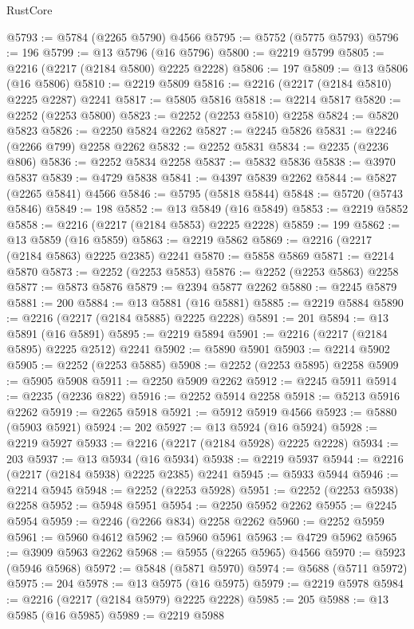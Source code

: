 \begin{lexlean}{RustCore}
\begin{coremodule}
@5793 := @5784 (@2265 @5790) @4566
@5795 := @5752 (@5775 @5793)
@5796 := 196
@5799 := @13 @5796 (@16 @5796)
@5800 := @2219 @5799
@5805 := @2216 (@2217 (@2184 @5800) @2225 @2228)
@5806 := 197
@5809 := @13 @5806 (@16 @5806)
@5810 := @2219 @5809
@5816 := @2216 (@2217 (@2184 @5810) @2225 @2287) @2241
@5817 := @5805 @5816
@5818 := @2214 @5817
@5820 := @2252 (@2253 @5800)
@5823 := @2252 (@2253 @5810) @2258
@5824 := @5820 @5823
@5826 := @2250 @5824 @2262
@5827 := @2245 @5826
@5831 := @2246 (@2266 @799) @2258 @2262
@5832 := @2252 @5831
@5834 := @2235 (@2236 @806)
@5836 := @2252 @5834 @2258
@5837 := @5832 @5836
@5838 := @3970 @5837
@5839 := @4729 @5838
@5841 := @4397 @5839 @2262
@5844 := @5827 (@2265 @5841) @4566
@5846 := @5795 (@5818 @5844)
@5848 := @5720 (@5743 @5846)
@5849 := 198
@5852 := @13 @5849 (@16 @5849)
@5853 := @2219 @5852
@5858 := @2216 (@2217 (@2184 @5853) @2225 @2228)
@5859 := 199
@5862 := @13 @5859 (@16 @5859)
@5863 := @2219 @5862
@5869 := @2216 (@2217 (@2184 @5863) @2225 @2385) @2241
@5870 := @5858 @5869
@5871 := @2214 @5870
@5873 := @2252 (@2253 @5853)
@5876 := @2252 (@2253 @5863) @2258
@5877 := @5873 @5876
@5879 := @2394 @5877 @2262
@5880 := @2245 @5879
@5881 := 200
@5884 := @13 @5881 (@16 @5881)
@5885 := @2219 @5884
@5890 := @2216 (@2217 (@2184 @5885) @2225 @2228)
@5891 := 201
@5894 := @13 @5891 (@16 @5891)
@5895 := @2219 @5894
@5901 := @2216 (@2217 (@2184 @5895) @2225 @2512) @2241
@5902 := @5890 @5901
@5903 := @2214 @5902
@5905 := @2252 (@2253 @5885)
@5908 := @2252 (@2253 @5895) @2258
@5909 := @5905 @5908
@5911 := @2250 @5909 @2262
@5912 := @2245 @5911
@5914 := @2235 (@2236 @822)
@5916 := @2252 @5914 @2258
@5918 := @5213 @5916 @2262
@5919 := @2265 @5918
@5921 := @5912 @5919 @4566
@5923 := @5880 (@5903 @5921)
@5924 := 202
@5927 := @13 @5924 (@16 @5924)
@5928 := @2219 @5927
@5933 := @2216 (@2217 (@2184 @5928) @2225 @2228)
@5934 := 203
@5937 := @13 @5934 (@16 @5934)
@5938 := @2219 @5937
@5944 := @2216 (@2217 (@2184 @5938) @2225 @2385) @2241
@5945 := @5933 @5944
@5946 := @2214 @5945
@5948 := @2252 (@2253 @5928)
@5951 := @2252 (@2253 @5938) @2258
@5952 := @5948 @5951
@5954 := @2250 @5952 @2262
@5955 := @2245 @5954
@5959 := @2246 (@2266 @834) @2258 @2262
@5960 := @2252 @5959
@5961 := @5960 @4612
@5962 := @5960 @5961
@5963 := @4729 @5962
@5965 := @3909 @5963 @2262
@5968 := @5955 (@2265 @5965) @4566
@5970 := @5923 (@5946 @5968)
@5972 := @5848 (@5871 @5970)
@5974 := @5688 (@5711 @5972)
@5975 := 204
@5978 := @13 @5975 (@16 @5975)
@5979 := @2219 @5978
@5984 := @2216 (@2217 (@2184 @5979) @2225 @2228)
@5985 := 205
@5988 := @13 @5985 (@16 @5985)
@5989 := @2219 @5988

\end{coremodule}
\end{lexlean}
